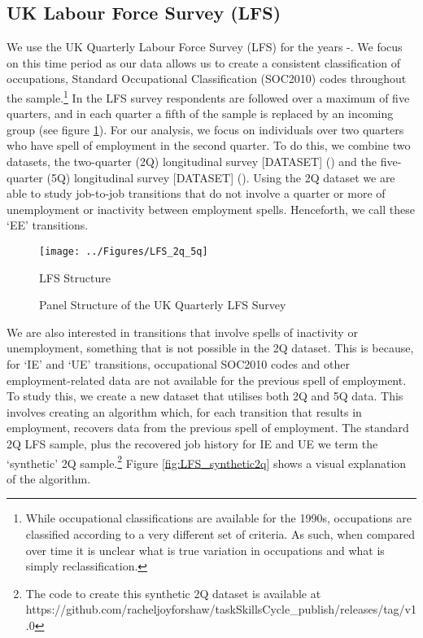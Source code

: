 \documentclass[12pt,authoryear]{elsarticle}
\begin{document}
	\subsection{UK Labour Force Survey (LFS)}
	\label{sec:LFS}
	We use the UK Quarterly Labour Force Survey (LFS) for the years \hspace{-1mm}-\hspace{1mm}\hspace{-1mm}. We focus on this time period as our data allows us to create a consistent classification of occupations, Standard Occupational Classification (SOC2010) codes throughout the sample.\footnote{While occupational classifications are available for the 1990s, occupations are classified according to a very different set of criteria. As such, when compared over time it is unclear what is true variation in occupations and what is simply reclassification.}  In the LFS survey respondents are followed over a maximum of five quarters, and in each quarter a fifth of the sample is replaced by an incoming group (see figure \ref{fig:LFS_2q_5q}). For our analysis, we focus on individuals over two quarters who have spell of employment in the second quarter. To do this, we combine two datasets, the two-quarter (2Q) longitudinal survey [DATASET] (\cite{LFS2Q}) and the five-quarter (5Q) longitudinal survey [DATASET] (\cite{LFS5Q}).  Using the 2Q dataset we are able to study job-to-job transitions that do not involve a quarter or more of unemployment or inactivity between employment spells. Henceforth, we call these `EE' transitions. 
	\begin{figure}[t!]
		\centering
		\texttt{[image: ../Figures/LFS\_2q\_5q]}
		\caption{LFS Structure}
		\caption*{\footnotesize{Panel Structure of the UK Quarterly LFS Survey}}
		\label{fig:LFS_2q_5q}
	\end{figure}
We are also interested in transitions that involve spells of inactivity or unemployment, something that is not possible in the 2Q dataset. This is because, for `IE' and `UE' transitions, occupational SOC2010 codes and other employment-related data are not available for the previous spell of employment. To study this, we create a new dataset that utilises both 2Q and 5Q data. This involves creating an algorithm which, for each transition that results in employment, recovers data from the previous spell of employment. The standard 2Q LFS sample, plus the recovered job history for IE and UE we term the `synthetic' 2Q sample.\footnote{The code to create this synthetic 2Q dataset is available at https://github.com/racheljoyforshaw/taskSkillsCycle\_publish/releases/tag/v1.0} Figure \ref{fig:LFS_synthetic2q} shows a visual explanation of the algorithm.
\end{document}
